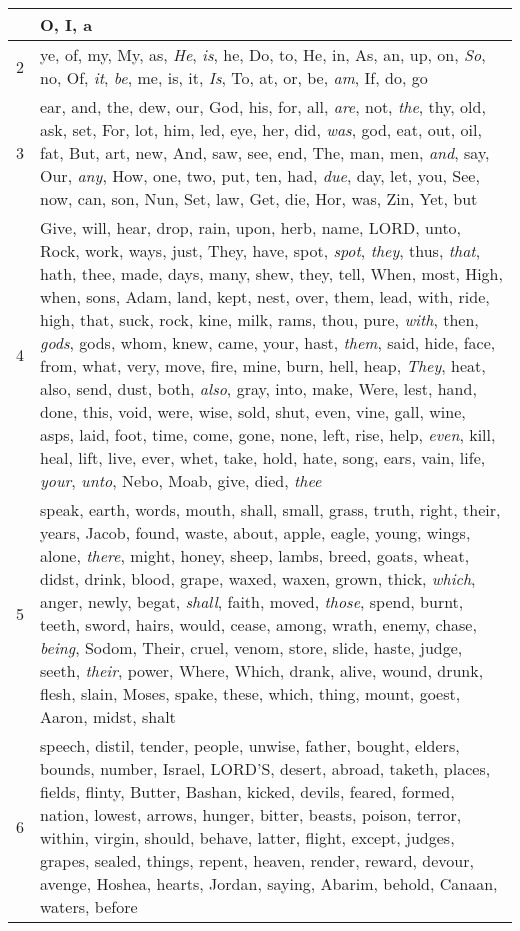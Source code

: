 \begin{longtable}{l|p{3.75in}}
\hline \hline
\endlastfoot
1 & O, I, a \\ \hline
2 & ye, of, my, My, as, \emph{He}, \emph{is}, he, Do, to, He, in, As, an, up, on, \emph{So}, no, Of, \emph{it}, \emph{be}, me, is, it, \emph{Is}, To, at, or, be, \emph{am}, If, do, go \\ \hline
3 & ear, and, the, dew, our, God, his, for, all, \emph{are}, not, \emph{the}, thy, old, ask, set, For, lot, him, led, eye, her, did, \emph{was}, god, eat, out, oil, fat, But, art, new, And, saw, see, end, The, man, men, \emph{and}, say, Our, \emph{any}, How, one, two, put, ten, had, \emph{due}, day, let, you, See, now, can, son, Nun, Set, law, Get, die, Hor, was, Zin, Yet, but \\ \hline
4 & Give, will, hear, drop, rain, upon, herb, name, LORD, unto, Rock, work, ways, just, They, have, spot, \emph{spot}, \emph{they}, thus, \emph{that}, hath, thee, made, days, many, shew, they, tell, When, most, High, when, sons, Adam, land, kept, nest, over, them, lead, with, ride, high, that, suck, rock, kine, milk, rams, thou, pure, \emph{with}, then, \emph{gods}, gods, whom, knew, came, your, hast, \emph{them}, said, hide, face, from, what, very, move, fire, mine, burn, hell, heap, \emph{They}, heat, also, send, dust, both, \emph{also}, gray, into, make, Were, lest, hand, done, this, void, were, wise, sold, shut, even, vine, gall, wine, asps, laid, foot, time, come, gone, none, left, rise, help, \emph{even}, kill, heal, lift, live, ever, whet, take, hold, hate, song, ears, vain, life, \emph{your}, \emph{unto}, Nebo, Moab, give, died, \emph{thee} \\ \hline
5 & speak, earth, words, mouth, shall, small, grass, truth, right, their, years, Jacob, found, waste, about, apple, eagle, young, wings, alone, \emph{there}, might, honey, sheep, lambs, breed, goats, wheat, didst, drink, blood, grape, waxed, waxen, grown, thick, \emph{which}, anger, newly, begat, \emph{shall}, faith, moved, \emph{those}, spend, burnt, teeth, sword, hairs, would, cease, among, wrath, enemy, chase, \emph{being}, Sodom, Their, cruel, venom, store, slide, haste, judge, seeth, \emph{their}, power, Where, Which, drank, alive, wound, drunk, flesh, slain, Moses, spake, these, which, thing, mount, goest, Aaron, midst, shalt \\ \hline
6 & speech, distil, tender, people, unwise, father, bought, elders, bounds, number, Israel, LORD'S, desert, abroad, taketh, places, fields, flinty, Butter, Bashan, kicked, devils, feared, formed, nation, lowest, arrows, hunger, bitter, beasts, poison, terror, within, virgin, should, behave, latter, flight, except, judges, grapes, sealed, things, repent, heaven, render, reward, devour, avenge, Hoshea, hearts, Jordan, saying, Abarim, behold, Canaan, waters, before \\ \hline

\end{longtable}
